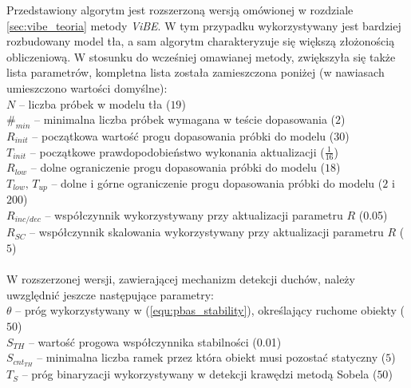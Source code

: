 Przedstawiony algorytm jest rozszerzoną wersją omówionej w rozdziale \ref{sec:vibe_teoria} metody \textit{ViBE}. 
W tym przypadku wykorzystywany jest bardziej rozbudowany model tła, a sam algorytm charakteryzuje się większą złożonością obliczeniową. 
W stosunku do wcześniej omawianej metody, zwiększyła się także lista parametrów, kompletna lista została zamieszczona poniżej (w nawiasach umieszczono wartości domyślne):\\
\-\hspace{1cm} $N$ -- liczba próbek w modelu tła ($19$)\\
\-\hspace{1cm} $\#_{min}$ -- minimalna liczba próbek wymagana w teście dopasowania ($2$)\\
\-\hspace{1cm} $R_{init}$ -- początkowa wartość progu dopasowania próbki do modelu ($30$) \\
\-\hspace{1cm} $T_{init}$ -- początkowe prawdopodobieństwo wykonania aktualizacji ($\frac{1}{16}$)\\
\-\hspace{1cm} $R_{low}$ -- dolne ograniczenie progu dopasowania próbki do modelu ($18$) \\
\-\hspace{1cm} $T_{low}, \, T_{up} $ -- dolne i górne ograniczenie progu dopasowania próbki do modelu ($2$ i $200$) \\
\-\hspace{1cm} $R_{inc/dec}$ -- współczynnik wykorzystywany przy aktualizacji parametru $R$ (\num{0.05}) \\
\-\hspace{1cm} $R_{SC}$ -- współczynnik skalowania wykorzystywany przy aktualizacji parametru $R$ ($5$)\\
\\
\noindent W rozszerzonej wersji, zawierającej mechanizm detekcji duchów, należy uwzględnić jeszcze następujące parametry:\\
\-\hspace{1cm} $\theta$ -- próg wykorzystywany w (\ref{equ:pbas_stability}), określający ruchome obiekty ($50$)\\
\-\hspace{1cm} $S_{TH}$ -- wartość progowa współczynnika stabilności (\num{0.01})\\
\-\hspace{1cm} $S_{cnt_{TH}}$ -- minimalna liczba ramek przez która obiekt musi pozostać statyczny ($5$) \\
\-\hspace{1cm} $T_{S}$ -- próg binaryzacji wykorzystywany w detekcji krawędzi metodą Sobela ($50$)\\

